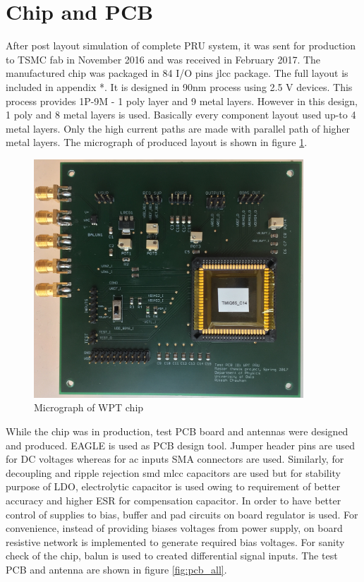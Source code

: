 \documentclass[12pt,a4paper,UKenglish]{article}
\begin{document}

\section{Chip and PCB}
After post layout simulation of complete PRU system, it was sent for production to TSMC fab in November 2016 and was received in February 2017. The  manufactured chip was packaged in 84 I/O pins \acrshort{jlcc} package. The full layout is included in appendix *. It is designed in 90nm process using 2.5 V devices. This process provides 1P-9M - 1 poly layer and 9 metal layers. However in this design, 1 poly and 8 metal layers is used. Basically every component layout used up-to 4 metal layers. Only the high current paths are made with parallel path of higher metal layers. The micrograph of produced layout is shown in figure \ref{fig:micrograph}.\\

\begin{figure} [H]
  \centering
  \includegraphics[width=0.9\textwidth]{img/pcb/test_pcb.jpg} 
 \caption{Micrograph of WPT chip} 
\label{fig:micrograph} 
\end{figure}


While the chip was in production, test PCB board and antennas were designed and produced. EAGLE is used as PCB design tool. Jumper header pins are used for DC voltages whereas for ac inputs SMA connectors are used. Similarly, for decoupling and ripple rejection \acrshort{smd} \acrshort{mlcc} capacitors are used but  for stability purpose of LDO, electrolytic capacitor is used owing to requirement of better accuracy and higher ESR for compensation capacitor.  In order to have better control of supplies to bias, buffer and pad circuits on board regulator is used. For convenience, instead of providing biases voltages from power supply, on board resistive network is implemented to generate required bias voltages. For sanity check of the chip, balun is used to created differential signal inputs. The test PCB and antenna are shown in figure \ref{fig:pcb_all}.\\
\end{document}
